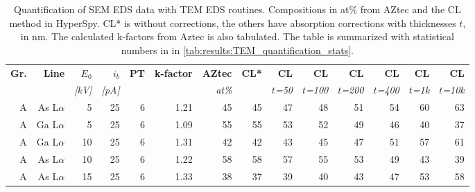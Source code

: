 \begin{table}[phtb]
    \begin{center}
        \caption{
            Quantification of SEM EDS data with TEM EDS routines.
            Compositions in at\% from AZtec and the CL method in HyperSpy. CL* is without corrections, the others have absorption corrections with thicknesses $t$, in nm.
            The calculated k-factors from Aztec is also tabulated. The table is summarized with statistical numbers in in \cref{tab:results:TEM_quantification_stats}.
        }
        \label{tab:results:TEM_quantification}
        \begin{tabular}{rrrrrrrrrrrrrr}
            \hline
            \textbf{Gr.} & \textbf{Line} & \textbf{$E_0$} & \textbf{$i_b$} & \textbf{PT} & \textbf{k-factor} & \textbf{AZtec} & \textbf{CL*} & \textbf{CL}   & \textbf{CL}    & \textbf{CL}    & \textbf{CL}    & \textbf{CL}   & \textbf{CL}    \\
            \emph{}      & \emph{}       & \emph{[kV]}    & \emph{[pA]}    & \emph{}     & \emph{}           & \emph{at\%}    & \emph{}      & \emph{$t$=50} & \emph{$t$=100} & \emph{$t$=200} & \emph{$t$=400} & \emph{$t$=1k} & \emph{$t$=10k} \\
            \hline
            A            & As L$\alpha$  & 5              & 25             & 6           & 1.21              & 45             & 45           & 47            & 48             & 51             & 54             & 60            & 63             \\
            A            & Ga L$\alpha$  & 5              & 25             & 6           & 1.09              & 55             & 55           & 53            & 52             & 49             & 46             & 40            & 37             \\
            A            & Ga L$\alpha$  & 10             & 25             & 6           & 1.31              & 42             & 42           & 43            & 45             & 47             & 51             & 57            & 61             \\
            A            & As L$\alpha$  & 10             & 25             & 6           & 1.22              & 58             & 58           & 57            & 55             & 53             & 49             & 43            & 39             \\
            A            & As L$\alpha$  & 15             & 25             & 6           & 1.33              & 38             & 37           & 39            & 40             & 43             & 47             & 53            & 58             \\

\end{tabular}
\end{center}
\end{table}
